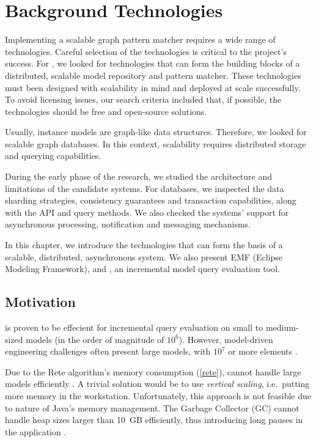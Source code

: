 \chapter{Background Technologies}
\label{chap:background-technologies}

Implementing a scalable graph pattern matcher requires a wide range of technologies. Careful selection of the technologies is critical to the project's success. For \iqd{}, we looked for technologies that can form the building blocks of a distributed, scalable model repository and pattern matcher. These technologies must been designed with scalability in mind and deployed at scale successfully. To avoid licensing issues, our search criteria included that, if possible, the technologies should be free and open-source solutions.

Usually, instance models are graph-like data structures. Therefore, we looked for scalable graph databases. In this context, scalability requires distributed storage and querying capabilities.

During the early phase of the research, we studied the architecture and limitations of the candidate systems. For databases, we inspected the data sharding strategies, consistency guarantees and transaction capabilities, along with the API and query methods. We also checked the systems' support for asynchronous processing, notification and messaging mechanisms.

In this chapter, we introduce the technologies that can form the basis of a scalable, distributed, asynchronous system. We also present EMF (Eclipse Modeling Framework), and \eiq{}, an incremental model query evaluation tool.


\section{Motivation}

\eiq{} is proven to be effecient for incremental query evaluation on small to medium-sized models (in the order of magnitude of $10^6$). However, model-driven engineering challenges often present large models, with $10^7$ or more elements \cite{Scheidgen12}. 

Due to the Rete algorithm's memory consumption (\autoref{rete}), \eiq{} cannot handle large models efficiently \cite{models10}. A trivial solution would be to use \emph{vertical scaling}, i.e.\ putting more memory in the workstation. Unfortunately, this approach is not feasible due to nature of Java's memory management. The Garbage Collector (GC) cannot handle heap sizes larger than 10~GB efficiently, thus introducing long pauses in the application \cite{Azul}. 

